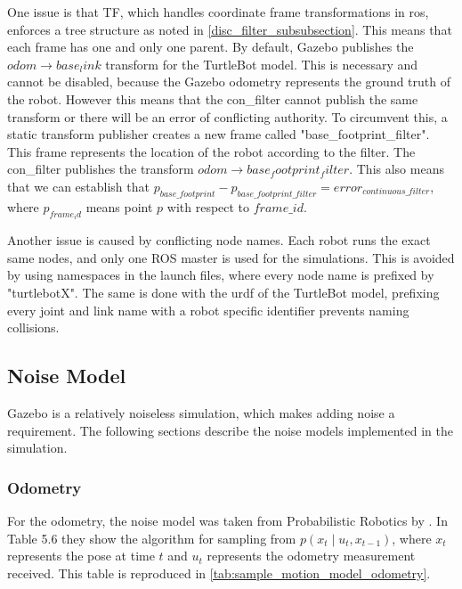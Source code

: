 \documentclass[thesis.tex]{subfile}
\begin{document}
One issue is that TF, which handles coordinate frame transformations in \gls{ros}, enforces a tree structure as noted in \autoref{disc_filter_subsubsection}. This means that each frame has one and only one parent. By default, Gazebo publishes the $odom \rightarrow base_link$ transform for the TurtleBot model. This is necessary and cannot be disabled, because the Gazebo odometry represents the ground truth of the robot. However this means that the \gls{con_filter} cannot publish the same transform or there will be an error of conflicting authority. To circumvent this, a static transform publisher creates a new frame called "base\_footprint\_filter". This frame represents the location of the robot according to the filter. The \gls{con_filter} publishes the transform $odom \rightarrow base_footprint_filter$. This also means that we can establish that $p_{base\_footprint} - p_{base\_footprint\_filter} = error_{continuous\_filter}$, where $p_{frame_id}$ means point $p$ with respect to $frame\_id$.

Another issue is caused by conflicting node names. Each robot runs the exact same nodes, and only one ROS master is used for the simulations. This is avoided by using namespaces in the launch files, where every node name is prefixed by "turtlebotX". The same is done with the \gls{urdf} of the TurtleBot model, prefixing every joint and link name with a robot specific identifier prevents naming collisions.

\subsection{Noise Model} \label{sec:noise_model}
Gazebo is a relatively noiseless simulation, which makes adding noise a requirement. The following sections describe the noise models implemented in the simulation.

\subsubsection{Odometry}
For the odometry, the noise model was taken from Probabilistic Robotics by \textcite[136]{ProbabilisticRobotics}. In Table 5.6 they show the algorithm for sampling from $p(x_t \mid u_t, x_{t-1})$, where $x_t$ represents the pose at time $t$ and $u_t$ represents the odometry measurement received. This table is reproduced in \autoref{tab:sample_motion_model_odometry}.
\end{document}
